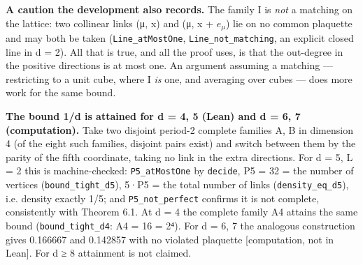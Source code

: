 \documentclass[11pt,a4paper]{article}
\theoremstyle{named}
\begin{document}
\textbf{A caution the development also records.} The family I is \textit{not} a matching on the lattice: two collinear links (μ, x) and (μ, x + $e_{μ}$) lie on no common plaquette and may both be taken (\texttt{Line\_\allowbreak{}atMostOne}, \texttt{Line\_\allowbreak{}not\_\allowbreak{}matching}, an explicit closed line in d = 2). All that is true, and all the proof uses, is that the out-degree in the positive directions is at most one. An argument assuming a matching — restricting to a unit cube, where I \textit{is} one, and averaging over cubes — does more work for the same bound.

\textbf{The bound 1/d is attained for d = 4, 5 (Lean) and d = 6, 7 (computation).} Take two disjoint period-2 complete families A, B in dimension 4 (of the eight such families, disjoint pairs exist) and switch between them by the parity of the fifth coordinate, taking no link in the extra directions. For d = 5, L = 2 this is machine-checked: \texttt{P5\_\allowbreak{}atMostOne} by \texttt{decide}, \textbar{}P5\textbar{} = 32 = the number of vertices (\texttt{bound\_\allowbreak{}tight\_\allowbreak{}d5}), 5·\textbar{}P5\textbar{} = the total number of links (\texttt{density\_\allowbreak{}eq\_\allowbreak{}d5}), i.e. density exactly 1/5; and \texttt{P5\_\allowbreak{}not\_\allowbreak{}perfect} confirms it is not complete, consistently with Theorem 6.1. At d = 4 the complete family A4 attains the same bound (\texttt{bound\_\allowbreak{}tight\_\allowbreak{}d4}: \textbar{}A4\textbar{} = 16 = 2⁴). For d = 6, 7 the analogous construction gives 0.166667 and 0.142857 with no violated plaquette [computation, not in Lean]. For d ≥ 8 attainment is not claimed.
\end{document}
